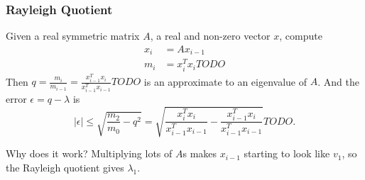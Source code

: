 \documentclass[class=article, crop=false]{standalone}
\theoremstyle{plain}
\theoremstyle{remark}
\begin{document}
\subsubsection{Rayleigh Quotient}
Given a real symmetric matrix $A$, a real and non-zero vector $x$, compute
\begin{align*}
	x_i&=Ax_{i-1}\\
	m_i &= x_i^{T} x_i TODO
\end{align*}
Then $q=\frac{m_i}{m_{i-1}}=\frac{x_{i-1}^{T}x_i}{x_{i-1}^{T} x_{i-1}} TODO$ is an approximate to an eigenvalue of $A$. 
And the error $\epsilon=q-\lambda$ is 
\[
	|\epsilon| \leq \sqrt{\frac{m_2}{m_0}-q^2}= \sqrt{\frac{x_i^{T}x_i}{x_{i-1}^{T}x_{i-1}}-\frac{x_{i-1}^{T}x_i}{x_{i-1}^{T}x_{i-1}}} TODO 
.\] 

Why does it work?
Multiplying lots of $A$s makes $x_{i-1}$ starting to look like $v_1$, so the Rayleigh quotient gives $\lambda_1$. 
\end{document}
